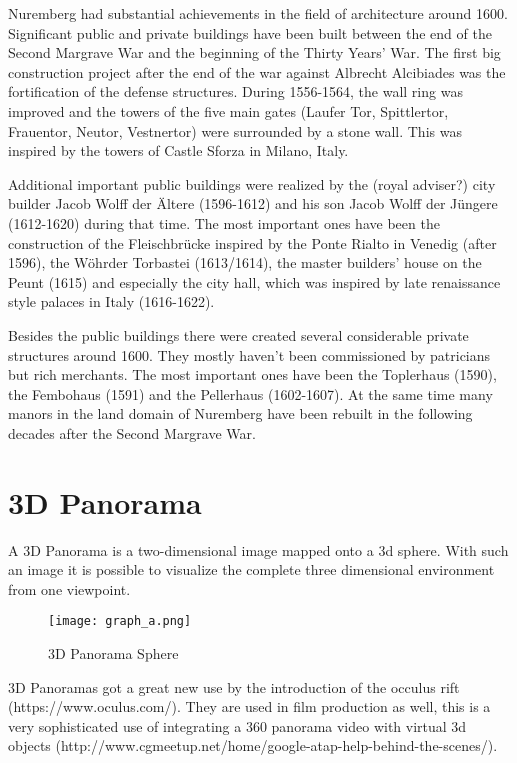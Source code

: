 Nuremberg had substantial achievements in the field of architecture around 1600. Significant public and private buildings have been built between the end of the Second Margrave War and the beginning of the Thirty Years' War.
The first big construction project after the end of the war against Albrecht Alcibiades was the fortification of the defense structures. During 1556-1564, the wall ring was improved and the towers of the five main gates (Laufer Tor, Spittlertor, Frauentor, Neutor, Vestnertor) were surrounded by a stone wall. This was inspired by the towers of Castle Sforza in Milano, Italy.

Additional important public buildings were realized by the (royal adviser?) city builder Jacob Wolff der Ältere (1596-1612) and his son Jacob Wolff der Jüngere (1612-1620) during that time. The most important ones have been the construction of the Fleischbrücke inspired by the Ponte Rialto in Venedig (after 1596), the Wöhrder Torbastei (1613/1614), the master builders' house on the Peunt (1615) and especially the city hall, which was inspired by late renaissance style palaces in Italy (1616-1622).

Besides the public buildings there were created several considerable private structures around 1600. They mostly haven't been commissioned by patricians but rich merchants. The most important ones have been the Toplerhaus (1590), the Fembohaus (1591) and the Pellerhaus (1602-1607).
At the same time many manors in the land domain of Nuremberg have been rebuilt in the following decades after the Second Margrave War.

\parencite[translated from German]{bookAcademiaNorica}




\section{3D Panorama}

A 3D Panorama is a two-dimensional image mapped onto a 3d sphere. With such an image it is possible to visualize the complete three dimensional environment from one viewpoint.

\pagestyle{fancy}

\begin{figure}[h]
	\centering
	\texttt{[image: graph\_a.png]}
	\caption{3D Panorama Sphere}
	\label{fig:3d_panorama_sphere}
\end{figure}

3D Panoramas got a great new use by the introduction of the occulus rift (https://www.oculus.com/). They are used in film production as well, this is a very sophisticated use of integrating a 360 panorama video with virtual 3d objects (http://www.cgmeetup.net/home/google-atap-help-behind-the-scenes/).

